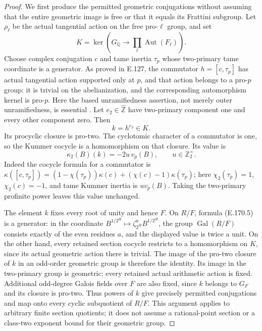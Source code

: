\begin{proof}
We first produce the permitted geometric conjugations without
assuming that the entire geometric image is free or that it equals
its Frattini subgroup. Let \(\rho_\ell\) be the actual tangential
action on the free pro-\(\ell\) group, and set
\[
 K=\ker\left(G_{\mathbb Q}\longrightarrow
                    \prod_\ell\operatorname{Aut}(F_\ell)\right).
 \tag{E.170.3}
\]
Choose complex conjugation \(c\) and tame inertia \(\tau_p\)
whose two-primary tame coordinate is a generator. As proved in
E.127, the commutator \(h=[c,\tau_p]\) has actual tangential
action supported only at \(p\), and that action belongs to a
pro-\(p\) group: it is trivial on the abelianization, and the
corresponding automorphism kernel is pro-\(p\). Here the based
unramifiedness assertion, not merely outer unramifiedness, is
essential \citep[Definition~2.0 and Theorem~2.1, pp.~198--200]
{AuditWojtkowiak2007}. Let \(e_2\in\widehat{\mathbb Z}\) have
two-primary component one and every other component zero. Then
\[
                         k=h^{e_2}\in K.
 \tag{E.170.4}
\]
Its procyclic closure is pro-two. The cyclotomic character of a
commutator is one, so the Kummer cocycle is a homomorphism on that
closure. Its value is
\[
 \kappa_2(B)(k)=-2u\,v_p(B),\qquad u\in\mathbb Z_2^\times.
 \tag{E.170.5}
\]
Indeed the cocycle formula for a commutator is
\(\kappa([c,\tau_p])=(1-\chi(\tau_p))\kappa(c)
 +(\chi(c)-1)\kappa(\tau_p)\); here \(\chi_2(\tau_p)=1\),
\(\chi_2(c)=-1\), and tame Kummer inertia is \(u v_p(B)\).
Taking the two-primary profinite power leaves this value unchanged.

The element \(k\) fixes every root of unity and hence \(F\).
On \(R/F\), formula (E.170.5) is a generator: in the coordinate
\(B^{1/2^H}\mapsto\zeta_{2^H}^{a}B^{1/2^H}\), the group
\(\operatorname{Gal}(R/F)\) consists exactly of the even
residues \(a\), and the displayed value is twice a unit.
On the other hand, every retained section cocycle restricts to a
homomorphism on \(K\), since its actual geometric action there is
trivial. The image of the pro-two closure of \(k\) in an odd-order
geometric group is therefore the identity. Its image in the
two-primary group is geometric; every retained actual arithmetic
action is fixed. Additional odd-degree Galois fields over \(F\)
are also fixed, since \(k\) belongs to \(G_F\) and its closure
is pro-two. Thus powers of \(k\) give precisely permitted
conjugations and map onto every cyclic subquotient of \(R/F\).
This argument applies to arbitrary finite section quotients; it
does not assume a rational-point section or a class-two exponent
bound for their geometric group.


\end{proof}

